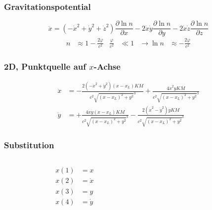 \documentclass{beamer}
\newcommand{\prac}[2]{\frac{\partial#1}{\partial#2}} %
\begin{document}
\begin{frame}
  \frametitle{Gravitationspotential}
  \begin{equation*}
    \ddot{x} = (-\dot{x}^2+\dot{y}^2+\dot{z}^2) \prac{\ln n}{x} -
    2\dot{x}\dot{y} \prac{\ln n}{y} - 2\dot{x}\dot{z} \prac{\ln n}{z}
  \end{equation*}
  \vspace{.5cm}
  \begin{align*}
    n &\approx 1-\frac{2\varphi}{c^2} &\frac{\varphi}{c^2} &\ll 1
    &\rightarrow \ln n &\approx -\frac{2\varphi}{c^2}
  \end{align*}
\end{frame}

\begin{frame}
  \frametitle{2D, Punktquelle auf \(x\)-Achse}
  \begin{align*}
    \ddot{x} &= -\frac{2(-\dot{x}^2+\dot{y}^2)(x-x_L)KM}
               {c^2\sqrt{(x-x_L)^2+y^2}^3}+
               \frac{4\dot{x}^2yKM}{c^2\sqrt{(x-x_L)^2+y^2}^3}\\
    \ddot{y} &= +\frac{4\dot{x}\dot{y}(x-x_L)KM}{c^2\sqrt{(x-x_L)^2+y^2}^3}
               - \frac{2(\dot{x}^2-\dot{y}^2)yKM}
               {c^2\sqrt{(x-x_L)^2+y^2}^3}
  \end{align*}
\end{frame}

\begin{frame}
  \frametitle{Substitution}
  \begin{columns}
    \begin{column}{.2\textwidth}
      \begin{align*}
        x(1) &= x\\
        x(2) &= \dot{x}\\
        x(3) &= y\\
        x(4) &= \dot{y}
      \end{align*}
    \end{column}
    \begin{column}{.8\textwidth}
    \end{column}
  \end{columns}
\end{frame}
\end{document}
